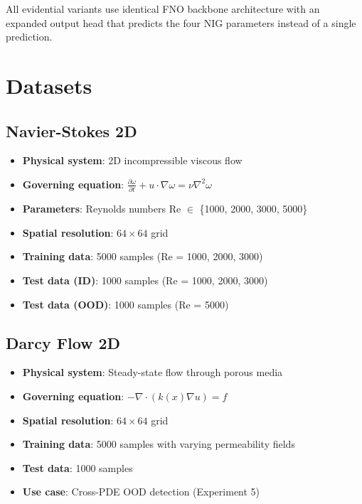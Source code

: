 All evidential variants use identical FNO backbone architecture with an expanded output head that predicts the four NIG parameters instead of a single prediction.

\section{Datasets}

\subsection{Navier-Stokes 2D}

\begin{itemize}
\item \textbf{Physical system}: 2D incompressible viscous flow \cite{anderson1995computational}
\item \textbf{Governing equation}: $\frac{\partial \omega}{\partial t} + u \cdot \nabla \omega = \nu \nabla^2 \omega$
\item \textbf{Parameters}: Reynolds numbers Re $\in$ \{1000, 2000, 3000, 5000\}
\item \textbf{Spatial resolution}: $64 \times 64$ grid
\item \textbf{Training data}: 5000 samples (Re = 1000, 2000, 3000)
\item \textbf{Test data (ID)}: 1000 samples (Re = 1000, 2000, 3000)
\item \textbf{Test data (OOD)}: 1000 samples (Re = 5000)
\end{itemize}

\subsection{Darcy Flow 2D}

\begin{itemize}
\item \textbf{Physical system}: Steady-state flow through porous media \cite{darcy1856}
\item \textbf{Governing equation}: $-\nabla \cdot (k(x) \nabla u) = f$
\item \textbf{Spatial resolution}: $64 \times 64$ grid
\item \textbf{Training data}: 5000 samples with varying permeability fields
\item \textbf{Test data}: 1000 samples
\item \textbf{Use case}: Cross-PDE OOD detection (Experiment 5)
\end{itemize}

